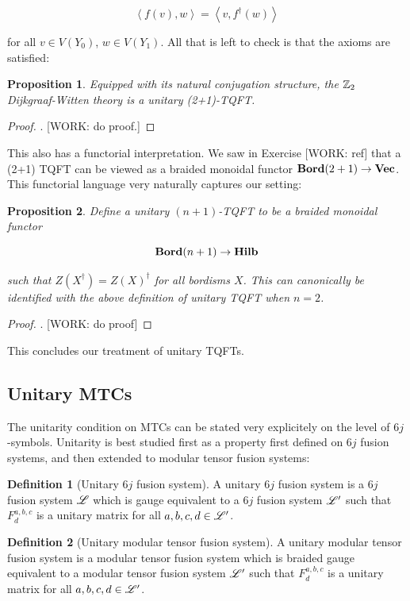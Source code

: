 \documentclass{article}
\newtheorem{proposition}{Proposition}[section]
\theoremstyle{definition}
\newtheorem*{definition}{Definition}
\numberwithin{figure}{section}
\begin{document}
$$\left<f(v),w\right>=\left<v,f^{\dagger}(w)\right>$$

for all $v\in V(Y_0)$, $w\in V(Y_1)$. All that is left to check is that the axioms are satisfied:

\begin{proposition} Equipped with its natural conjugation structure, the $\mathbb{Z}_2$ Dijkgraaf-Witten theory is a unitary (2+1)-TQFT.
\end{proposition}
\begin{proof}. [WORK: do proof.]
\end{proof}

This also has a functorial interpretation. We saw in Exercise [WORK: ref] that a (2+1) TQFT can be viewed as a braided monoidal functor $\bold{Bord}(2+1)\to \bold{Vec}$. This functorial language very naturally captures our setting:

\begin{proposition} Define a unitary $(n+1)$-TQFT to be a braided monoidal functor

$$\bold{Bord}(n+1)\to \bold{Hilb}$$

such that $Z\left(X^{\dagger}\right)=Z(X)^{\dagger}$ for all bordisms $X$. This can canonically be identified with the above definition of unitary TQFT when $n=2$.
\end{proposition}
\begin{proof}. [WORK: do proof]
\end{proof}

This concludes our treatment of unitary TQFTs.

\subsection{Unitary MTCs}

The unitarity condition on MTCs can be stated very explicitely on the level of $6j$-symbols. Unitarity is best studied first as a property first defined on $6j$ fusion systems, and then extended to modular tensor fusion systems:

\begin{definition}[Unitary $6j$ fusion system] A unitary $6j$ fusion system is a $6j$ fusion system $\mathscr{L}$ which is gauge equivalent to a $6j$ fusion system $\mathscr{L}'$ such that $F^{a,b,c}_{d}$ is a unitary matrix for all $a,b,c,d\in \mathscr{L}'$.

\raggedleft\qedsymbol{}
\end{definition}


\begin{definition}[Unitary modular tensor fusion system] A unitary modular tensor fusion system is a modular tensor fusion system which is braided gauge equivalent to a modular tensor fusion system $\mathscr{L}'$ such that $F^{a,b,c}_{d}$ is a unitary matrix for all $a,b,c,d\in\mathscr{L}'$.

\raggedleft\qedsymbol{}
\end{definition}
\end{document}
